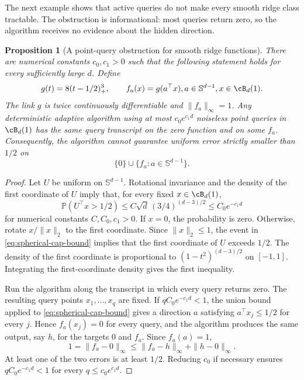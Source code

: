 \documentclass[11pt,twoside]{article}
\renewcommand{\P}{\mathbb P}
\newtheorem{proposition}[theorem]{Proposition}
\theoremstyle{definition}
\theoremstyle{remark}
\begin{document}
The next example shows that active queries do not make every smooth ridge
class tractable. The obstruction is informational: most queries return zero,
so the algorithm receives no evidence about the hidden direction.

\begin{proposition}[A point-query obstruction for smooth ridge functions]
\label{prop:ridge-query-lower-bound}
There are numerical constants $c_0,c_1>0$ such that the following statement
holds for every sufficiently large $d$. Define
\begin{equation}
 g(t)=8(t-1/2)_+^3,
 \qquad
 f_a(x)=g(a^\top x),\quad a\in\mathbb S^{d-1},\quad x\in\cB_d(1).
 \label{eq:hidden-cap-ridge-functions}
\end{equation}
The link $g$ is twice continuously differentiable and
$\|f_a\|_\infty=1$. Any deterministic adaptive algorithm using at most
$c_0e^{c_1d}$ noiseless point queries in $\cB_d(1)$ has the same query
transcript on the zero function and on some $f_a$. Consequently, the algorithm
cannot guarantee uniform error strictly smaller than $1/2$ on
\begin{equation}
 \{0\}\cup\{f_a:a\in\mathbb S^{d-1}\}.
 \label{eq:hidden-cap-function-class}
\end{equation}
\end{proposition}

\begin{proof}
Let $U$ be uniform on $\mathbb S^{d-1}$. Rotational invariance and the density
of the first coordinate of $U$ imply that, for every fixed
$x\in\cB_d(1)$,
\begin{equation}
 \P(U^\top x>1/2)
 \leq C\sqrt d\,(3/4)^{(d-3)/2}
 \leq C_0e^{-c_1d}
 \label{eq:spherical-cap-bound}
\end{equation}
for numerical constants $C,C_0,c_1>0$. If $x=0$, the probability is zero.
Otherwise, rotate $x/\|x\|_2$ to the first coordinate. Since
$\|x\|_2\leq1$, the event in \cref{eq:spherical-cap-bound} implies that the
first coordinate of $U$ exceeds $1/2$. The density of the first coordinate is proportional to
$(1-t^2)^{(d-3)/2}$ on $[-1,1]$. Integrating the first-coordinate density
gives the first inequality.

Run the algorithm along the transcript in which every query returns zero.
The resulting query points $x_1,\ldots,x_q$ are fixed. If
$qC_0e^{-c_1d}<1$, the union bound applied to
\cref{eq:spherical-cap-bound} gives a direction $a$ satisfying
$a^\top x_j\leq1/2$ for every $j$. Hence $f_a(x_j)=0$ for every query, and
the algorithm produces the same output, say $h$, for the targets $0$ and
$f_a$. Since $f_a(a)=1$,
\[
 1=\|f_a-0\|_\infty
 \leq\|f_a-h\|_\infty+\|h-0\|_\infty.
\]
At least one of the two errors is at least $1/2$. Reducing $c_0$ if necessary
ensures $qC_0e^{-c_1d}<1$ for every
$q\leq c_0e^{c_1d}$.
\end{proof}
\end{document}
